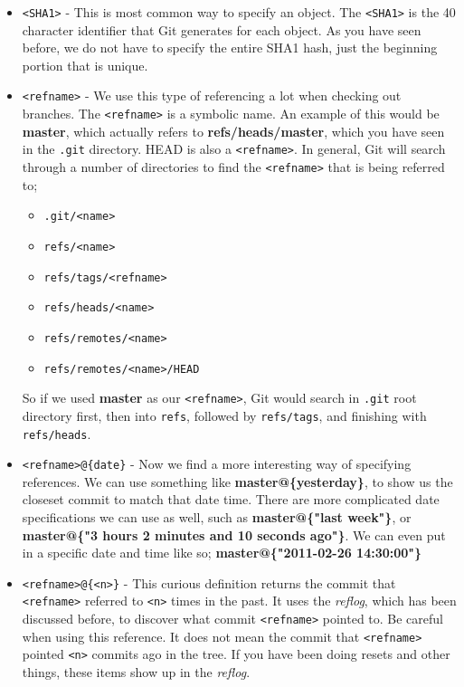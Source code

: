 \begin{itemize}
\item{}\texttt{<SHA1>} - This is most common way to specify an object.
The \texttt{<SHA1>} is the 40 character identifier that Git generates for each object.
As you have seen before, we do not have to specify the entire SHA1 hash, just the beginning portion that is unique.
\item{}\texttt{<refname>} - We use this type of referencing a lot when checking out branches.  
The \texttt{<refname>} is a symbolic name.
An example of this would be \textbf{master}, which actually refers to \textbf{refs/heads/master}, which you have seen in the \texttt{.git} directory.
HEAD is also a \texttt{<refname>}.  In general, Git will search through a number of directories to find the \texttt{<refname>} that is being referred to;
\begin{itemize}
\item \texttt{.git/<name>}
\item \texttt{refs/<name>}
\item \texttt{refs/tags/<refname>}
\item \texttt{refs/heads/<name>}
\item \texttt{refs/remotes/<name>}
\item \texttt{refs/remotes/<name>/HEAD}
\end{itemize}
So if we used \textbf{master} as our \texttt{<refname>}, Git would search in \texttt{.git} root directory first,
then into \texttt{refs}, followed by \texttt{refs/tags}, and finishing with \texttt{refs/heads}.
\item{}\texttt{<refname>@\{date\}} - Now we find a more interesting way of specifying references.
We can use something like \textbf{master@\{yesterday\}}, to show us the closeset commit to match that date time.  
There are more complicated date specifications we can use as well, such as \textbf{master@\{"last week"\}}, or \textbf{master@\{"3 hours 2 minutes and 10 seconds ago"\}}.
We can even put in a specific date and time like so; \textbf{master@\{"2011-02-26 14:30:00"\}}
\item\texttt{<refname>@\{<n>\}} - This curious definition returns the commit that \texttt{<refname>} referred to \texttt{<n>} times in the past.
It uses the \emph{reflog}, which has been discussed before, to discover what commit \texttt{<refname>} pointed to.
Be careful when using this reference.  It does not mean the commit that \texttt{<refname>} pointed \texttt{<n>} commits ago in the tree.
If you have been doing resets and other things, these items show up in the \emph{reflog}.

\end{itemize}
